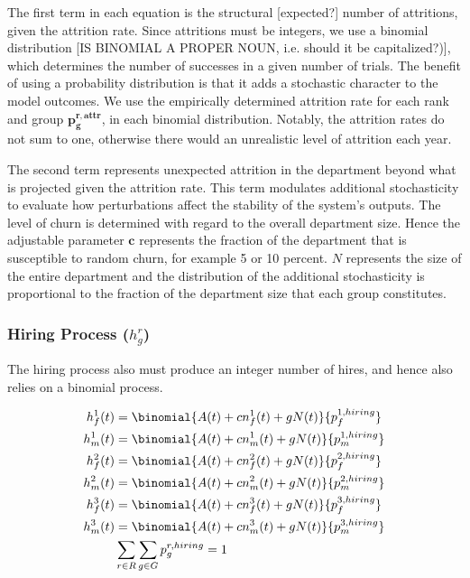 \documentclass[12pt, a4paper, oneside, headinclude, footinclude,english]{article}
\begin{document}
The first term in each equation is the structural [expected?] number of attritions, given the attrition rate. Since
attritions must be integers, we use a binomial distribution [IS BINOMIAL A PROPER NOUN, i.e. should it be capitalized?)], which determines the
number of successes in a given number of trials. The benefit of using a
probability distribution is that it adds a stochastic character to the model
outcomes. We use the empirically determined attrition rate for each rank and
group $\bm{p^{r,attr}_g}$, in each binomial distribution. Notably, the attrition
rates do not sum to one, otherwise there would an unrealistic level of attrition
each year.

The second term represents unexpected attrition in the department beyond what is projected given the attrition rate. This term modulates additional stochasticity to evaluate how perturbations affect the stability of the system's outputs. The level of churn is determined with regard to the
overall department size. Hence the adjustable parameter $\bm{c}$ represents the
fraction of the department that is susceptible to random churn, for example 5 or 10
percent. $N$ represents the size of the entire department and the distribution
of the additional stochasticity is proportional to the fraction of the
department size that each group constitutes. 

\subsubsection{Hiring Process ($h^r_g$)}
\label{sec:hiring}

The hiring process also must produce an integer number of hires, and hence also
relies on a binomial process.


\begin{align}
  h^1_f(t) &= \binomial{A(t) + cn^1_f(t) + gN(t)}{p^{1, hiring}_f}  \label{eq:hiring_f1}\\
  h^1_m(t) &= \binomial{A(t) + cn^1_m(t) + gN(t)}{p^{1, hiring}_m}  \label{eq:hiring_m1}\\
  h^2_f(t) &= \binomial{A(t) + cn^2_f(t) + gN(t)}{p^{2, hiring}_f}  \label{eq:hiring_f2}\\
  h^2_m(t) &= \binomial{A(t) + cn^2_m(t) + gN(t)}{p^{2, hiring}_m}  \label{eq:hiring_m2}\\
  h^3_f(t) &= \binomial{A(t) + cn^3_f(t) + gN(t)}{p^{3, hiring}_f}  \label{eq:hiring_f3}\\
  h^3_m(t) &= \binomial{A(t) + cn^3_m(t) + gN(t)}{p^{3, hiring}_m}  \label{eq:hiring_m3}\\
  &\sum_{r \in R}\sum_{g \in G}p_g^{r, hiring} = 1 \label{eq:hiring_constraint}
\end{align}
\end{document}
